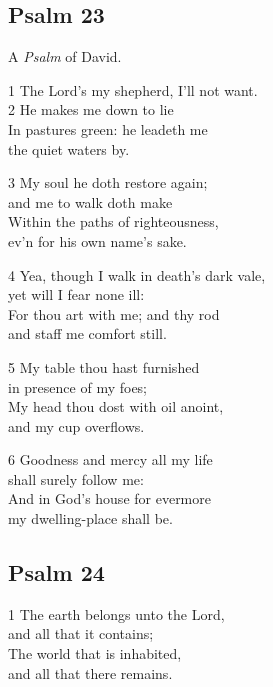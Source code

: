 \begin{multicols}{3}
\subsection*{Psalm 23 }

A \emph{Psalm} of David.

1 The Lord’s my shepherd, I’ll not want.\\
2 He makes me down to lie\\
In pastures green: he leadeth me\\
the quiet waters by.

3 My soul he doth restore again;\\
and me to walk doth make\\
Within the paths of righteousness,\\
ev’n for his own name’s sake.

4 Yea, though I walk in death’s dark vale,\\
yet will I fear none ill:\\
For thou art with me; and thy rod\\
and staff me comfort still.

5 My table thou hast furnished\\
in presence of my foes;\\
My head thou dost with oil anoint,\\
and my cup overflows.

6 Goodness and mercy all my life\\
shall surely follow me:\\
And in God’s house for evermore\\
my dwelling-place shall be.

\begin{center}
\quad{}\quad{}
\end{center}

\subsection*{Psalm 24 }

1 The earth belongs unto the Lord,\\
and all that it contains;\\
The world that is inhabited,\\
and all that there remains.


\end{multicols}
